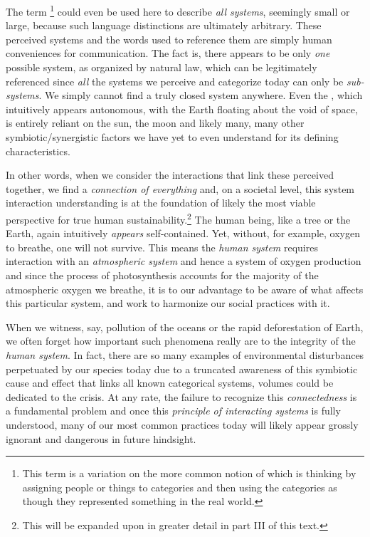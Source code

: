 \documentclass[10pt, a4paper, cleardoubleempty, openright, twoside]{book}
\begin{document}
The term \footnote{
	This term is a variation on the more common notion of
	 which is thinking by assigning people
	or things to categories and then using the categories as though they
	represented something in the real world.
} 
could even be used here to describe \emph{all systems}, seemingly small
or large, because such language distinctions are ultimately arbitrary.
These perceived systems and the words used to reference them are simply
human conveniences for communication. The fact is, there appears to be
only \emph{one} possible system, as organized by natural law, which can
be legitimately referenced since \emph{all} the systems we perceive and
categorize today can only be \emph{sub-systems}. We simply cannot find a
truly closed system anywhere. Even the , which
intuitively appears autonomous, with the Earth floating about the void
of space, is entirely reliant on the sun, the moon and likely many, many
other symbiotic/synergistic factors we have yet to even understand for
its defining characteristics.

In other words, when we consider the interactions that link these
perceived  together, we find a
\emph{connection of everything} and, on a societal level, this system
interaction understanding is at the foundation of likely the most viable
perspective for true human sustainability.\footnote{
	This will be expanded upon in greater detail in part III of this text.
} 
The human being, like a tree or the Earth, again intuitively
\emph{appears} self-contained. Yet, without, for example, oxygen to
breathe, one will not survive. This means the \emph{human system}
requires interaction with an \emph{atmospheric system} and hence a
system of oxygen production and since the process of photosynthesis
accounts for the majority of the atmospheric oxygen we breathe, it is to
our advantage to be aware of what affects this particular system, and
work to harmonize our social practices with it.

When we witness, say, pollution of the oceans or the rapid deforestation
of Earth, we often forget how important such phenomena really are to the
integrity of the \emph{human system}. In fact, there are so many
examples of environmental disturbances perpetuated by our species today
due to a truncated awareness of this symbiotic cause and effect that
links all known categorical systems, volumes could be dedicated to the
crisis. At any rate, the failure to recognize this \emph{connectedness}
is a fundamental problem and once this \emph{principle of interacting
systems} is fully understood, many of our most common practices today
will likely appear grossly ignorant and dangerous in future hindsight.
\end{document}

